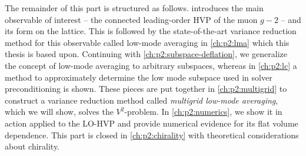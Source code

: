 The remainder of this part is structured as follows.
 introduces the main observable of interest -- the connected leading-order HVP of the muon $g-2$ -- and its form on the lattice.
This is followed by the state-of-the-art variance reduction method for this observable called low-mode averaging in \cref{ch:p2:lma} which this thesis is based upon.
Continuing with \cref{ch:p2:subspace-deflation}, we generalize the concept of low-mode averaging to arbitrary subspaces, whereas in \cref{ch:p2:lc} a method to approximately determine the low mode subspace used in solver preconditioning is shown.
These pieces are put together in \cref{ch:p2:multigrid} to construct a variance reduction method called \emph{multigrid low-mode averaging}, which we will show, solves the $V^{2}$-problem.
In \cref{ch:p2:numerics}, we show it in action applied to the LO-HVP and provide numerical evidence for its flat volume dependence.
This part is closed in \cref{ch:p2:chirality} with theoretical considerations about chirality.


